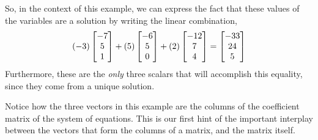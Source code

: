 \documentclass{ximera}
\begin{document}
\begin{example}
\begin{question}
    \begin{feedback}[correct]
      So, in the context of this example, we can express the fact that
      these values of the variables are a solution by writing the
      linear combination,
      \[
        (-3)\begin{bmatrix}-7\\5\\1\end{bmatrix}+
        (5)\begin{bmatrix}-6\\5\\0\end{bmatrix}+
        (2)\begin{bmatrix}-12\\7\\4\end{bmatrix}
        =
        \begin{bmatrix}-33\\24\\5\end{bmatrix}
      \]
      Furthermore, these are the \textit{only} three scalars that will
      accomplish this equality, since they come from a unique
      solution.

      Notice how the three vectors in this example are the columns of
      the coefficient matrix of the system of equations.  This is our
      first hint of the important interplay between the vectors that
      form the columns of a matrix, and the matrix itself.
    \end{feedback}
  \end{question}

\end{example}
\end{document}
